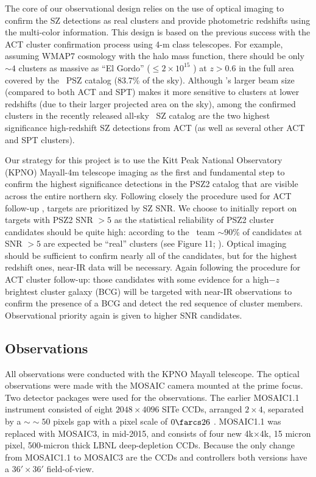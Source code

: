\documentclass[apj, revtex4-1]{emulateapj}
\begin{document}
The core of our observational design relies on the use of optical imaging to confirm the SZ detections as real clusters and provide photometric redshifts using the multi-color information. This design is based on the previous success with the ACT cluster confirmation process using 4-m class telescopes.
%
For example, assuming WMAP7 cosmology \citep{Komatsu2011} with the \cite{Tinker2008} halo mass function, there should be only $\sim4$ clusters as massive as ``El Gordo'' ($\leq 2 \times 10^{15}$ \Msol) at $z > 0.6$ in the full area covered by the \planck\ PSZ catalog (83.7\% of the sky). Although \planck’s larger beam size (compared to both ACT and SPT) makes it more sensitive to clusters at lower redshifts (due to their larger projected area on the sky), among the confirmed clusters in the recently released all-sky \planck\ SZ catalog are the two highest significance high-redshift SZ detections from ACT (as well as several other ACT and SPT clusters).

Our strategy for this project is to use the Kitt Peak National Observatory (KPNO) Mayall-4m telescope imaging as the first and fundamental step to confirm the highest significance detections in the PSZ2 catalog that are visible across the entire northern sky.
%
%
Following closely the procedure used for ACT follow-up , targets are prioritized by SZ SNR. We choose to initially report on targets with PSZ2 SNR $>5$ as the statistical reliability of PSZ2 cluster candidates should be quite high: according to the \planck\ team $\sim90$\% of candidates at SNR $>5$ are expected be ``real'' clusters (see Figure 11; \citealt{PlanckCollaboration2016}).
%
Optical imaging should be sufficient to confirm nearly all of the candidates, but for the highest redshift ones, near-IR data will be necessary. Again following the procedure for ACT cluster follow-up: those candidates with some evidence for a high$-z$ brightest cluster galaxy (BCG) will be targeted with near-IR observations to confirm the presence of a BCG and detect the red sequence of cluster members. Observational priority again is given to higher SNR candidates.

\subsection{Observations}\label{sec: observations}
All observations were conducted with the KPNO Mayall telescope. The optical observations were made with the MOSAIC camera mounted at the prime focus. Two detector packages were used for the observations. The earlier MOSAIC1.1 instrument consisted of eight $2048\times4096$ SITe CCDs, arranged $2\times4$, separated by a $∼\sim50$ pixels gap with a pixel scale of $0\farcs26$ \perpixel. MOSAIC1.1 was replaced with MOSAIC3, in mid-2015, and consists of four new 4k$\times$4k, 15 micron pixel, 500-micron thick LBNL deep-depletion CCDs. Because the only change from MOSAIC1.1 to MOSAIC3 are the CCDs and controllers both versions have a $36' \times 36'$ field-of-view.
\end{document}
